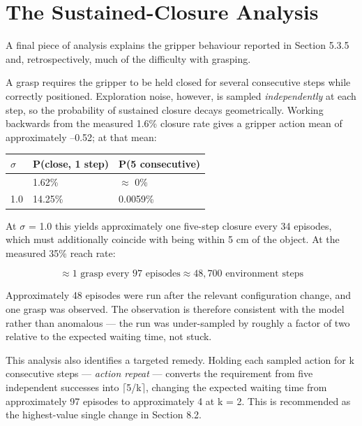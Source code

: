 \documentclass[12pt,a4paper,oneside]{report}
\begin{document}
\hypertarget{the-sustained-closure-analysis}{%
\section{The Sustained-Closure Analysis}\label{the-sustained-closure-analysis}}

A final piece of analysis explains the gripper behaviour reported in Section
5.3.5 and, retrospectively, much of the difficulty with grasping.

A grasp requires the gripper to be held closed for several consecutive steps
while correctly positioned. Exploration noise, however, is sampled
\emph{independently} at each step, so the probability of sustained closure decays
geometrically. Working backwards from the measured 1.6\% closure rate gives a
gripper action mean of approximately --0.52; at that mean:

\begin{longtable}[]{@{}lll@{}}
\toprule\noalign{}
$\sigma$ & P(close, 1 step) & P(5 consecutive) \\
\midrule\noalign{}
\endhead
\bottomrule\noalign{}
\endlastfoot
0.5 & 1.62\% & $\approx$ 0\% \\
1.0 & 14.25\% & 0.0059\% \\
\end{longtable}

At $\sigma$ = 1.0 this yields approximately one five-step closure every 34
episodes, which must additionally coincide with being within 5 cm of the object.
At the measured 35\% reach rate:

\begin{equation*}
\approx 1 \text{ grasp every } 97 \text{ episodes} \approx 48{,}700 \text{ environment steps}
\end{equation*}

Approximately 48 episodes were run after the relevant configuration change, and
one grasp was observed. The observation is therefore consistent with the model
rather than anomalous --- the run was under-sampled by roughly a factor of two
relative to the expected waiting time, not stuck.

This analysis also identifies a targeted remedy. Holding each sampled action for
k consecutive steps --- \emph{action repeat} --- converts the requirement from five
independent successes into $\lceil$5/k$\rceil$, changing the expected waiting
time from approximately 97 episodes to approximately 4 at k = 2. This is
recommended as the highest-value single change in Section 8.2.
\end{document}
